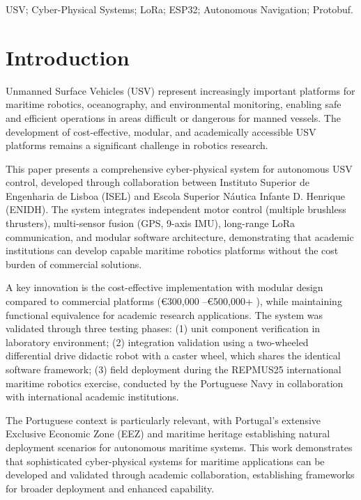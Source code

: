 \documentclass[conference]{IEEEtran}
\begin{document}
\begin{IEEEkeywords}
USV; Cyber-Physical Systems; LoRa; ESP32; Autonomous Navigation; Protobuf.
\end{IEEEkeywords}

\section{Introduction}
\label{sec:intro}
Unmanned Surface Vehicles (USV) represent increasingly important platforms for maritime robotics, oceanography, and environmental monitoring, enabling safe and efficient operations in areas difficult or dangerous for manned vessels. The development of cost-effective, modular, and academically accessible USV platforms remains a significant challenge in robotics research.

This paper presents a comprehensive cyber-physical system for autonomous USV control, developed through collaboration between Instituto Superior de Engenharia de Lisboa (ISEL) and Escola Superior Náutica Infante D. Henrique (ENIDH). The system integrates independent motor control (multiple brushless thrusters), multi-sensor fusion (GPS, 9-axis IMU), long-range LoRa communication, and modular software architecture, demonstrating that academic institutions can develop capable maritime robotics platforms without the cost burden of commercial solutions.

A key innovation is the cost-effective implementation with modular design compared to commercial platforms (€300,000 \cite{wave-glider} --€500,000+ \cite{saildrone}), while maintaining functional equivalence for academic research applications. The system was validated through three testing phases: (1) unit component verification in laboratory environment; (2) integration validation using a two-wheeled differential drive didactic robot with a caster wheel, which shares the identical software framework; (3) field deployment during the REPMUS25 international maritime robotics exercise, conducted by the Portuguese Navy in collaboration with international academic institutions.

The Portuguese context is particularly relevant, with Portugal's extensive Exclusive Economic Zone (EEZ) and maritime heritage establishing natural deployment scenarios for autonomous maritime systems. This work demonstrates that sophisticated cyber-physical systems for maritime applications can be developed and validated through academic collaboration, establishing frameworks for broader deployment and enhanced capability.
\end{document}
